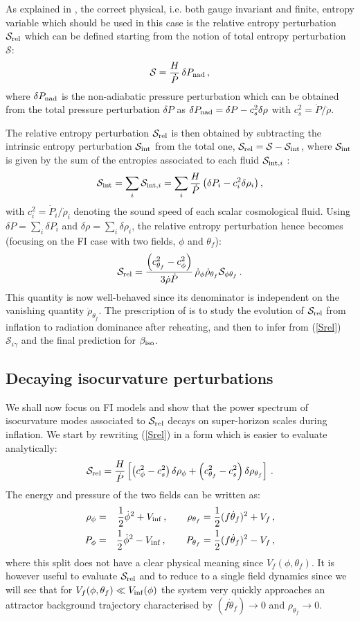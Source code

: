 \documentclass[aps,prd,a4paper,twocolumn,amsmath,showpacs,superscriptaddress,nofootinbib,preprintnumbers]{revtex4-1}
\newcommand{\be}{\begin{equation}}
\newcommand{\ee}{\end{equation}}
\newcommand{\bea}{\begin{eqnarray}}
\newcommand{\eea}{\end{eqnarray}}
\newcommand{\mc}{\mathcal}
\begin{document}
As explained in \cite{Cicoli:2021yhb}, the correct physical, i.e. both gauge invariant and finite, entropy variable which should be used in this case is the relative entropy perturbation $\mc{S}_{\rm rel}$ which can be defined starting from the notion of total entropy perturbation $\mc{S}$:
\be
\mc{S}=\frac{H}{\dot{P}}\,\delta P_{\rm nad}\,,
\label{eq:S}
\ee
where $\delta P_{\rm nad}$ is the non-adiabatic pressure perturbation which can be obtained from the total pressure perturbation $\delta P$ as $\delta P_{\rm nad}=\delta P-c_s^2 \delta\rho$ with $c_s^2=\dot P/\dot \rho$. 

The relative entropy perturbation $\mc{S}_{\rm rel}$ is then obtained by subtracting the intrinsic entropy perturbation $\mc{S}_{\rm int}$ from the total one, $\mc{S}_{\rm rel}= \mc{S}-\mc{S}_{\rm int}$, where $\mc{S}_{\rm int}$ is given by the sum of the entropies associated to each fluid $\mc{S}_{{\rm int},i}$ \cite{Malik:2004tf}:
\be
\mc{S}_{\rm int}=\sum_i \mc{S}_{{\rm int},i}=\sum_i\frac{H}{\dot{P}}\left(\delta P_i - c_i^2 \delta \rho_i\right),
\label{eq:Sint}
\ee
with $c_i^2=\dot P_i/\dot\rho_i$ denoting the sound speed of each scalar cosmological fluid. Using $\delta P = \sum_i \delta P_i$ and $\delta \rho = \sum_i \delta \rho_i$, the relative entropy perturbation hence becomes (focusing on the FI case with two fields, $\phi$ and $\theta_f$):
\be
\mc{S}_{\rm rel} = \frac{\left(c_{\theta_f}^2-c_\phi^2\right)}{3\dot\rho\dot P}\, \dot\rho_\phi \dot\rho_{\theta_f}  \mc{S}_{\phi \theta_f}\,.
\label{Srel}
\ee
This quantity is now well-behaved since its denominator is independent on the vanishing quantity $\dot\rho_{\theta_f}$. The prescription of \cite{Cicoli:2021yhb} is to study the evolution of $\mc{S}_{\rm rel}$ from inflation to radiation dominance after reheating, and then to infer from (\ref{Srel}) $\mc{S}_{i\gamma}$ and the final prediction for $\beta_{\rm iso}$. 

\subsection{Decaying isocurvature perturbations}

We shall now focus on FI models and show that the power spectrum of isocurvature modes associated to $\mc{S}_{\rm rel}$ decays on super-horizon scales during inflation. We start by rewriting (\ref{Srel}) in a form which is easier to evaluate analytically: 
\be
\mc{S}_{\rm rel}=\frac{H}{\dot P} \left[\left( c_\phi^2-c_s^2\right)\delta\rho_\phi+\left( c_{\theta_f}^2-c_s^2\right)\delta\rho_{\theta_f}\right]\,.
\label{Srelnew}
\ee
The energy and pressure of the two fields can be written as: 
\bea
\rho_\phi&=&\frac12 \dot\phi^2+V_{\rm inf}\,,\qquad \rho_{\theta_f}=\frac12 (f\dot\theta_f)^2+V_f\,, \nonumber \\
P_\phi&=&\frac12 \dot\phi^2-V_{\rm inf}\,,\qquad P_{\theta_f}=\frac12 (f\dot\theta_f)^2-V_f\,,
\eea
where this split does not have a clear physical meaning since $V_f(\phi,\theta_f)$. It is however useful to evaluate $\mc{S}_{\rm rel}$ and to reduce to a single field dynamics since we will see that for $V_f(\phi,\theta_f)\ll V_{\rm inf}(\phi)$ the system very quickly approaches an attractor background trajectory characterised by $(f\dot\theta_f)\to 0$ and $\rho_{\theta_f}\to 0$.
\end{document}
